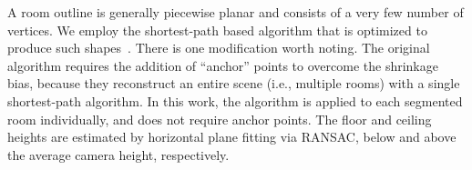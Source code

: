 A room outline is generally piecewise planar and consists of a very few
number of vertices. We employ the shortest-path based algorithm that is
optimized to produce such shapes~\cite{Cabral2014}. There is one
modification worth noting. The original algorithm requires the addition
of ``anchor'' points to overcome the shrinkage bias, because
they reconstruct an entire scene (i.e., multiple rooms) with a single
shortest-path algorithm.
%
In this work, the algorithm is applied to each segmented
room individually, and does not require anchor points.
%
The floor and ceiling heights are estimated by horizontal plane fitting
via RANSAC, 
below and above the average camera height, respectively.








